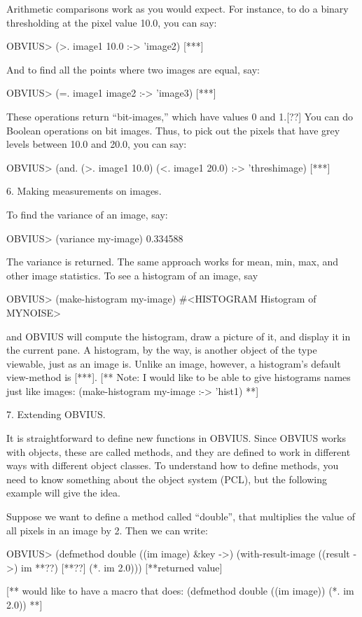 Arithmetic comparisons work as you would expect.  For instance,
to do a binary thresholding at the pixel value 10.0, you can say:

OBVIUS> (>. image1 10.0 :-> 'image2)
[***]

And to find all the points where two images are equal, say:

OBVIUS> (=. image1 image2 :-> 'image3)
[***]

These operations return ``bit-images,'' which have values 0 and 1.[??]
You can do Boolean operations on bit images.  Thus, to pick out the
pixels that have grey levels between 10.0 and 20.0, you can say:

OBVIUS> (and. (>. image1 10.0) (<. image1 20.0) :-> 'threshimage)
[***]


6. Making measurements on images.

To find the variance of an image, say:

OBVIUS> (variance my-image)
0.334588

The variance is returned.
The same approach works for mean, min, max,  and other image statistics.
To see a histogram of an image, say

OBVIUS> (make-histogram my-image)
#<HISTOGRAM Histogram of MYNOISE>

and OBVIUS will compute the histogram, draw a picture of it, and
display it in the current pane.  A histogram, by the way, is another
object of the type viewable, just as an image is.  Unlike an image,
however, a histogram's default view-method is [***].
[** Note: I would like to be able to give histograms names just like images:
(make-histogram my-image :-> 'hist1) **]


7. Extending OBVIUS.

It is straightforward to define new functions in OBVIUS.
Since OBVIUS works with objects, these are called methods,
and they are defined to work in different ways with different
object classes.  To understand how to define methods, you
need to know something about the object system (PCL), but
the following example will give the idea.

Suppose we want to define a method called ``double'', that multiplies
the value of all pixels in an image by 2. Then we can write:

OBVIUS> (defmethod double ((im image) &key ->)
	(with-result-image ((result ->) im **??)  [**??]
	(*. im 2.0)))
[**returned value]

[** would like to have a macro that does:
(defmethod double ((im image)) (*. im 2.0))  **]

